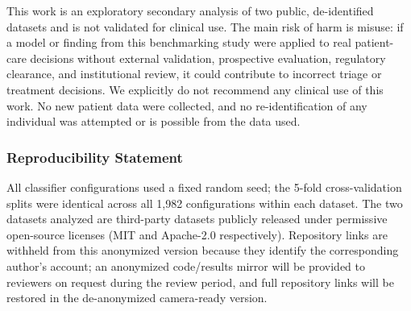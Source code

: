 \documentclass[10pt]{article} %
\begin{document}
This work is an exploratory secondary analysis of two public, de-identified datasets and is not validated for clinical use. The main risk of harm is misuse: if a model or finding from this benchmarking study were applied to real patient-care decisions without external validation, prospective evaluation, regulatory clearance, and institutional review, it could contribute to incorrect triage or treatment decisions. We explicitly do not recommend any clinical use of this work. No new patient data were collected, and no re-identification of any individual was attempted or is possible from the data used.

\subsubsection*{Reproducibility Statement}

All classifier configurations used a fixed random seed; the 5-fold cross-validation splits were identical across all 1,982 configurations within each dataset. The two datasets analyzed are third-party datasets publicly released under permissive open-source licenses (MIT and Apache-2.0 respectively). Repository links are withheld from this anonymized version because they identify the corresponding author's account; an anonymized code/results mirror will be provided to reviewers on request during the review period, and full repository links will be restored in the de-anonymized camera-ready version.


\newpage
\end{document}

